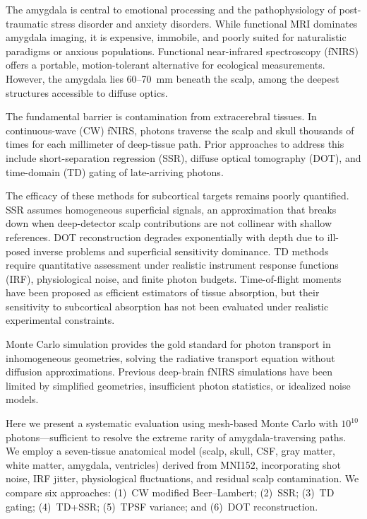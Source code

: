 \documentclass[11pt,a4paper]{article}
\begin{document}
The amygdala is central to emotional processing\cite{lindquist2012brain} and the pathophysiology of post-traumatic stress disorder and anxiety disorders. While functional MRI dominates amygdala imaging, it is expensive, immobile, and poorly suited for naturalistic paradigms or anxious populations. Functional near-infrared spectroscopy (fNIRS)\cite{scholkmann2014review} offers a portable, motion-tolerant alternative for ecological measurements. However, the amygdala lies 60--70~mm beneath the scalp, among the deepest structures accessible to diffuse optics.

The fundamental barrier is contamination from extracerebral tissues. In continuous-wave (CW) fNIRS, photons traverse the scalp and skull thousands of times for each millimeter of deep-tissue path. Prior approaches to address this include short-separation regression (SSR), diffuse optical tomography (DOT), and time-domain (TD) gating of late-arriving photons.

The efficacy of these methods for subcortical targets remains poorly quantified. SSR assumes homogeneous superficial signals, an approximation that breaks down when deep-detector scalp contributions are not collinear with shallow references. DOT reconstruction degrades exponentially with depth due to ill-posed inverse problems and superficial sensitivity dominance. TD methods require quantitative assessment under realistic instrument response functions (IRF), physiological noise, and finite photon budgets. Time-of-flight moments have been proposed as efficient estimators of tissue absorption, but their sensitivity to subcortical absorption has not been evaluated under realistic experimental constraints.

Monte Carlo simulation provides the gold standard for photon transport in inhomogeneous geometries, solving the radiative transport equation without diffusion approximations\cite{wang1995mcml,fang2009mesh,fang2010mesh}. Previous deep-brain fNIRS simulations have been limited by simplified geometries, insufficient photon statistics, or idealized noise models\cite{strangman2014review,liebert2003monte,dehghani2009depth}.

Here we present a systematic evaluation using mesh-based Monte Carlo with $10^{10}$ photons---sufficient to resolve the extreme rarity of amygdala-traversing paths. We employ a seven-tissue anatomical model (scalp, skull, CSF, gray matter, white matter, amygdala, ventricles) derived from MNI152, incorporating shot noise, IRF jitter, physiological fluctuations, and residual scalp contamination. We compare six approaches: (1)~CW modified Beer--Lambert; (2)~SSR; (3)~TD gating; (4)~TD+SSR; (5)~TPSF variance; and (6)~DOT reconstruction.
\end{document}

